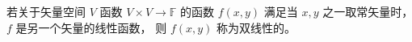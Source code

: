 

若关于矢量空间 $V$ 函数 $V\times V \to \mathbb F$ 的函数 $f(x,y)$ 满足当 $x,y$ 之一取常矢量时， $f$ 是另一个矢量的线性函数， 则 $f(x, y)$ 称为双线性的。
